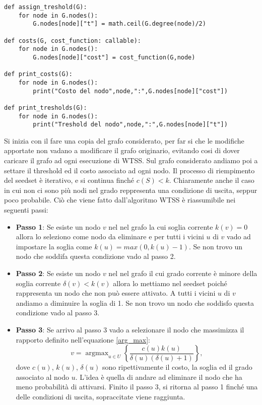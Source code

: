 \begin{code}
\begin{verbatim}
def assign_treshold(G):
    for node in G.nodes():
        G.nodes[node]["t"] = math.ceil(G.degree(node)/2)

def costs(G, cost_function: callable):
    for node in G.nodes():
        G.nodes[node]["cost"] = cost_function(G,node)

def print_costs(G):
    for node in G.nodes():
        print("Costo del nodo",node,":",G.nodes[node]["cost"])

def print_tresholds(G):
    for node in G.nodes():
        print("Treshold del nodo",node,":",G.nodes[node]["t"])
\end{verbatim}
\end{code}

Si inizia con il fare una copia del grafo considerato, per far si che le modifiche apportate non vadano a modificare il grafo originario, evitando cosi di dover caricare il grafo ad ogni esecuzione di WTSS. Sul grafo considerato andiamo poi a settare il threshold ed il costo associato ad ogni nodo. Il processo di riempimento del seedset è iterativo, e si continua finché $c(S) < k$.  Chiaramente anche il caso in cui non ci sono più nodi nel grado reppresenta una condizione di uscita, seppur poco probabile.
Ciò che viene fatto dall'algoritmo WTSS è riassumibile nei seguenti passi:
\begin{itemize}
    \item \textbf{Passo 1}: Se esiste un nodo $v$ nel nel grafo la cui soglia corrente $k(v) = 0$ allora lo seleziono come nodo da eliminare e per tutti i vicini $u$ di $v$ vado ad impostare la soglia come $k(u) = max(0, k(u)-1)$. Se non trovo un nodo che soddifa questa condizione vado al passo 2.
    \item \textbf{Passo 2}: Se esiste un nodo $v$ nel nel grafo il cui grado corrente è minore della soglia corrente $\delta(v) < k(v)$ allora lo mettiamo nel seedset poiché rappresenta un nodo che non può essere attivato. A tutti i vicini $u$ di $v$ andiamo a diminuire la soglia di 1. Se non trovo un nodo che soddisfo questa condizione vado al passo 3.
    \item \textbf{Passo 3}: Se arrivo al passo 3 vado a selezionare il nodo che massimizza il rapporto definito nell'equazione \ref{arg_max}: 
    \begin{equation}
         v=\operatorname{argmax}_{u \in U}\left\{\frac{c(u) k(u)}{\delta(u)(\delta(u)+1)}\right\},
    \label{arg_max}
    \end{equation}
    dove $c(u)$, $k(u)$, $\delta(u)$ sono ripettivamente il costo, la soglia ed il grado associato al nodo $u$. L'idea è quella di andare ad eliminare il nodo che ha meno probabilità di attivarsi. Finito il passo 3, si ritorna al passo 1 finché una delle condizioni di uscita, sopraccitate viene raggiunta.
\end{itemize}



